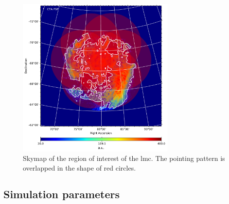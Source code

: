 \documentclass[main.tex]{subfiles}
\begin{document}
    \begin{figure}
      \centering
      \includegraphics[width=0.7\textwidth]{Pictures/lmc_hi_cdensity_flipped_plot_1000GeV_1TeV.pdf}
      \caption{\label{fig:pointings} Skymap of the region of interest of the \gls{lmc}. The pointing pattern is overlapped in the shape of red circles.}
    \end{figure}

    \subsection{Simulation parameters}
\end{document}
